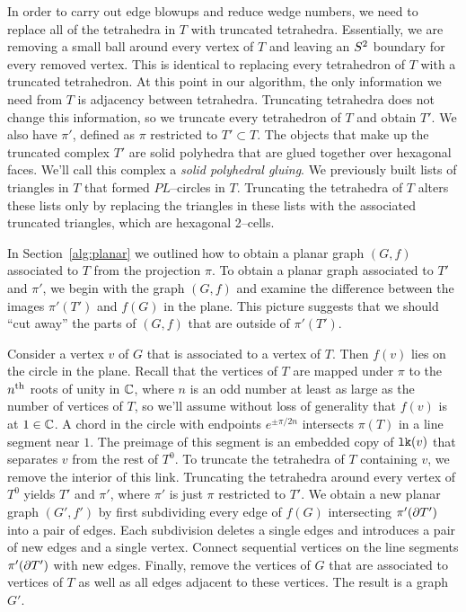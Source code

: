 \label{alg:truncttet}

In order to carry out edge blowups and reduce wedge numbers, we need to replace all of the tetrahedra in $T$ with truncated tetrahedra.
Essentially, we are removing a small ball around every vertex of $T$ and leaving an $S^2$ boundary for every removed vertex.
This is identical to replacing every tetrahedron of $T$ with a truncated tetrahedron.
At this point in our algorithm, the only information we need from $T$ is adjacency between tetrahedra.
Truncating tetrahedra does not change this information, so we truncate every tetrahedron of $T$ and obtain $T'$.
We also have $\pi'$, defined as $\pi$ restricted to $T'\subset T$.
The objects that make up the truncated complex $T'$ are solid polyhedra that are glued together over hexagonal faces.
We'll call this complex a \emph{solid polyhedral gluing}.
We previously built lists of triangles in $T$ that formed $PL$--circles in $T$.
Truncating the tetrahedra of $T$ alters these lists only by replacing the triangles in these lists with the associated truncated triangles, which are hexagonal 2--cells.

In Section~\ref{alg:planar} we outlined how to obtain a planar graph $(G,f)$ associated to $T$ from the projection $\pi$.
To obtain a planar graph associated to $T'$ and $\pi'$, we begin with the graph $(G,f)$ and examine the difference between the images $\pi'(T')$ and $f(G)$ in the plane.
This picture suggests that we should ``cut away'' the parts of $(G,f)$ that are outside of $\pi'(T')$.

Consider a vertex $v$ of $G$ that is associated to a vertex of $T$.
Then $f(v)$ lies on the circle in the plane.
Recall that the vertices of $T$ are mapped under $\pi$ to the $n^{\text{th}}$ roots of unity in $\mathbb{C}$, where $n$ is an odd number at least as large as the number of vertices of $T$, so we'll assume without loss of generality that $f(v)$ is at $1\in\mathbb{C}$.
A chord in the circle with endpoints $e^{\pm\pi/2n}$ intersects $\pi(T)$ in a line segment near $1$.
The preimage of this segment is an embedded copy of $\texttt{lk}(v)$ that separates $v$ from the rest of $T^0$.
To truncate the tetrahedra of $T$ containing $v$, we remove the interior of this link.
Truncating the tetrahedra around every vertex of $T^0$ yields $T'$ and $\pi'$, where $\pi'$ is just $\pi$ restricted to $T'$.
We obtain a new planar graph $(G',f')$ by first subdividing every edge of $f(G)$ intersecting $\pi'(\partial T')$ into a pair of edges.
Each subdivision deletes a single edges and introduces a pair of new edges and a single vertex.
Connect sequential vertices on the line segments $\pi'(\partial T')$ with new edges.
Finally, remove the vertices of $G$ that are associated to vertices of $T$ as well as all edges adjacent to these vertices.
The result is a graph $G'$.

